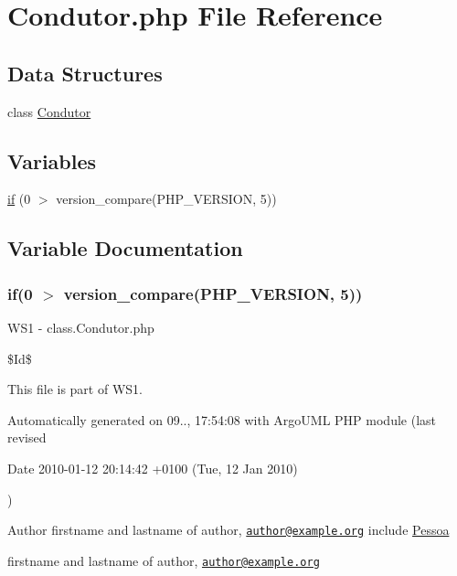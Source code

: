 \hypertarget{_condutor_8php}{}\section{Condutor.\+php File Reference}
\label{_condutor_8php}
\subsection*{Data Structures}
\begin{DoxyCompactItemize}
\item 
class \hyperlink{class_condutor}{Condutor}
\end{DoxyCompactItemize}
\subsection*{Variables}
\begin{DoxyCompactItemize}
\item 
\hyperlink{_condutor_8php_a88cb244e17cabaf4dee5fb3acb8168e0}{if} (0 $>$ version\+\_\+compare(P\+H\+P\+\_\+\+V\+E\+R\+S\+I\+O\+N, \textquotesingle{}5\textquotesingle{}))
\end{DoxyCompactItemize}


\subsection{Variable Documentation}
\hypertarget{_condutor_8php_a88cb244e17cabaf4dee5fb3acb8168e0}{}
\subsubsection[{if}]{\setlength{\rightskip}{0pt plus 5cm}if(0 $>$ version\+\_\+compare(P\+H\+P\+\_\+\+V\+E\+R\+S\+I\+O\+N, \textquotesingle{}5\textquotesingle{}))}\label{_condutor_8php_a88cb244e17cabaf4dee5fb3acb8168e0}
W\+S1 -\/ class.\+Condutor.\+php

\$\+Id\$

This file is part of W\+S1.

Automatically generated on 09.., 17\+:54\+:08 with Argo\+U\+M\+L P\+H\+P module (last revised \begin{DoxyParagraph}{Date}
2010-\/01-\/12 20\+:14\+:42 +0100 (Tue, 12 Jan 2010) 
\end{DoxyParagraph}
)

\begin{DoxyAuthor}{Author}
firstname and lastname of author, \href{mailto:author@example.org}{\tt author@example.\+org} include \hyperlink{class_pessoa}{Pessoa}

firstname and lastname of author, \href{mailto:author@example.org}{\tt author@example.\+org} 
\end{DoxyAuthor}
